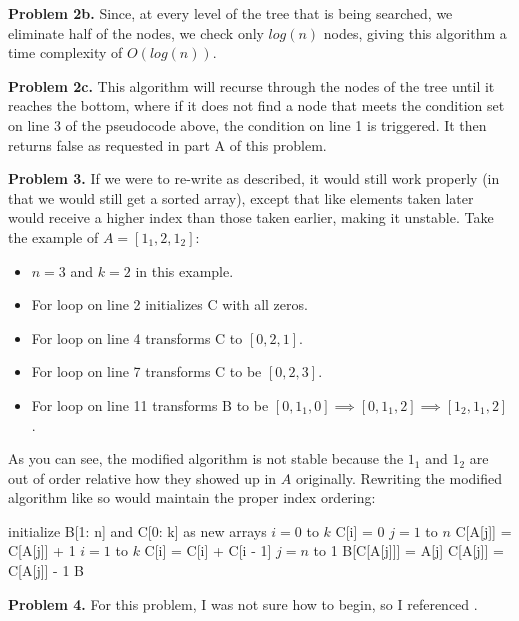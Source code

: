 \documentclass{article}
\begin{document}
\textbf{Problem 2b.} Since, at every level of the tree that is being searched, we eliminate half of the nodes, we check only $log(n)$ nodes, giving this algorithm a time complexity of $O(log(n))$.

\textbf{Problem 2c.} This algorithm will recurse through the nodes of the tree until it reaches the bottom, where if it does not find a node that meets the condition set on line 3 of the pseudocode above, the condition on line 1 is triggered. It then returns false as requested in part A of this problem.

\hfill

\textbf{Problem 3.} If we were to re-write  as described, it would still work properly (in that we would still get a sorted array), except that like elements taken later would receive a higher index than those taken earlier, making it unstable. Take the example of $A = [1_1, 2, 1_2]$:

\begin{itemize}
    \item $n = 3$ and $k = 2$ in this example.
    \item For loop on line 2 initializes C with all zeros.
    \item For loop on line 4 transforms C to $[0, 2, 1]$.
    \item For loop on line 7 transforms C to be $[0, 2, 3]$.
    \item For loop on line 11 transforms B to be $[0, 1_1, 0] \implies [0, 1_1, 2] \implies [1_2, 1_1, 2]$.
\end{itemize}

As you can see, the modified algorithm is not stable because the $1_1$ and $1_2$ are out of order relative how they showed up in $A$ originally. Rewriting the modified algorithm like so would maintain the proper index ordering:

\begin{codebox}
    \li initialize B[1: n] and C[0: k] as new arrays
    \li \For $i = 0$ to $k$ \Do
    \li C[i] = 0 \End
    \li \For $j = 1$ to $n$ \Do
    \li C[A[j]] = C[A[j]] + 1 \End
    \li \For $i = 1$ to $k$ \Do
    \li C[i] = C[i] + C[i - 1] \End
    \li \For $j = n$ to 1 \Do
    \li B[C[A[j]]] = A[j]
    \li C[A[j]] = C[A[j]] - 1 \End
    \li \Return B
\end{codebox}

\hfill

\textbf{Problem 4.} For this problem, I was not sure how to begin, so I referenced \cite{website:3}.
\end{document}
